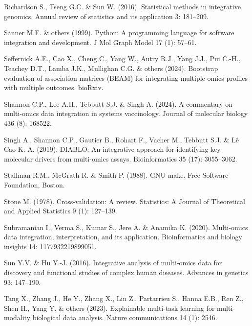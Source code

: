 \documentclass[
]{article}
\newlength{\cslhangindent}
\newlength{\cslentryspacingunit} %
\newenvironment{CSLReferences}[2] %
 {%
  \setlength{\parindent}{0pt}
  \ifodd #1
  \let\oldpar\par
  \def\par{\hangindent=\cslhangindent\oldpar}
  \fi
  \setlength{\parskip}{#2\cslentryspacingunit}
 }%
 {}
\begin{document}
\begin{CSLReferences}{1}{0}
\leavevmode{}%
Richardson S., Tseng G.C. \& Sun W. (2016). Statistical methods in integrative genomics. Annual review of statistics and its application 3: 181--209.

\leavevmode{}%
Sanner M.F. \& others (1999). Python: A programming language for software integration and development. J Mol Graph Model 17 (1): 57--61.

\leavevmode{}%
Seffernick A.E., Cao X., Cheng C., Yang W., Autry R.J., Yang J.J., Pui C.-H., Teachey D.T., Lamba J.K., Mullighan C.G. \& others (2024). Bootstrap evaluation of association matrices (BEAM) for integrating multiple omics profiles with multiple outcomes. bioRxiv.

\leavevmode{}%
Shannon C.P., Lee A.H., Tebbutt S.J. \& Singh A. (2024). A commentary on multi-omics data integration in systems vaccinology. Journal of molecular biology 436 (8): 168522.

\leavevmode{}%
Singh A., Shannon C.P., Gautier B., Rohart F., Vacher M., Tebbutt S.J. \& Lê Cao K.-A. (2019). DIABLO: An integrative approach for identifying key molecular drivers from multi-omics assays. Bioinformatics 35 (17): 3055--3062.

\leavevmode{}%
Stallman R.M., McGrath R. \& Smith P. (1988). GNU make. Free Software Foundation, Boston.

\leavevmode{}%
Stone M. (1978). Cross-validation: A review. Statistics: A Journal of Theoretical and Applied Statistics 9 (1): 127--139.

\leavevmode{}%
Subramanian I., Verma S., Kumar S., Jere A. \& Anamika K. (2020). Multi-omics data integration, interpretation, and its application. Bioinformatics and biology insights 14: 1177932219899051.

\leavevmode{}%
Sun Y.V. \& Hu Y.-J. (2016). Integrative analysis of multi-omics data for discovery and functional studies of complex human diseases. Advances in genetics 93: 147--190.

\leavevmode{}%
Tang X., Zhang J., He Y., Zhang X., Lin Z., Partarrieu S., Hanna E.B., Ren Z., Shen H., Yang Y. \& others (2023). Explainable multi-task learning for multi-modality biological data analysis. Nature communications 14 (1): 2546.


\end{CSLReferences}
\end{document}
